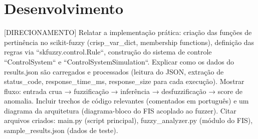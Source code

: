 \section{Desenvolvimento}

[DIRECIONAMENTO] Relatar a implementação prática: criação das funções de pertinência no scikit-fuzzy (crisp\_var\_dict, membership functions), definição das regras via ``skfuzzy.control.Rule``, construção do sistema de controle ``ControlSystem`` e ``ControlSystemSimulation``. Explicar como os dados do results.json são carregados e processados (leitura do JSON, extração de status\_code, response\_time\_ms, response\_size para cada execução). Mostrar fluxo: entrada crua → fuzzificação → inferência → desfuzzificação → score de anomalia. Incluir trechos de código relevantes (comentados em português) e um diagrama da arquitetura (diagrama-bloco do FIS acoplado ao fuzzer). Citar arquivos criados: main.py (script principal), fuzzy\_analyzer.py (módulo do FIS), sample\_results.json (dados de teste).
\endinput
